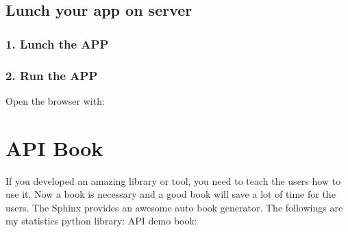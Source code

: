 \documentclass[letterpaper,12pt,english]{sphinxmanual}
\begin{document}
\begin{sphinxVerbatim}[commandchars=\\\{\}]
   
           
         
\end{sphinxVerbatim}


\section{Lunch your app on server}
\label{\detokenize{deploy:lunch-your-app-on-server}}

\subsection{1. Lunch the APP}
\label{\detokenize{deploy:lunch-the-app}}
%
\begin{sphinxVerbatim}[commandchars=\\\{\}]
 
\end{sphinxVerbatim}


\subsection{2. Run the APP}
\label{\detokenize{deploy:run-the-app}}
Open the browser with: 

\begin{figure}[htbp]
\centering

\noindent{}
\end{figure}


\chapter{API Book}
\label{\detokenize{api:api-book}}\label{\detokenize{api:api}}\label{\detokenize{api::doc}}
If you developed an amazing library or tool, you need to teach the users how to use it. Now a  book is necessary and a good  book will save a lot of time for the users. The Sphinx provides an awesome auto  book generator. The followings are my statistics python library:  API demo book:
\end{document}
